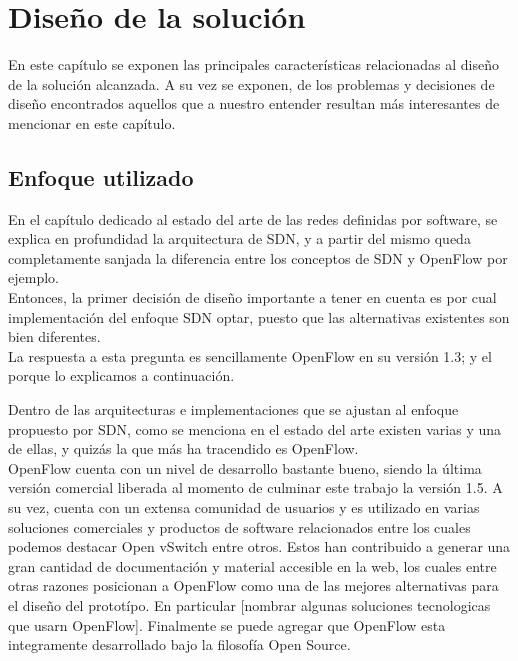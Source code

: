 \chapter{Dise\~no de la soluci\'on}

\ifpdf
    \graphicspath{{Chapter3/Figs/Raster/}{Chapter3/Figs/PDF/}{Chapter3/Figs/}}
\else
    \graphicspath{{Chapter3/Figs/Vector/}{Chapter3/Figs/}}
\fi

En este cap\'itulo se exponen las principales caracter\'isticas relacionadas al dise\~no de la soluci\'on alcanzada. A su vez se exponen, de los problemas y decisiones de dise\~no encontrados aquellos que a nuestro entender resultan m\'as interesantes de mencionar en este cap\'itulo. 
 
\section[Enfoque utilizado]{Enfoque utilizado}

En el cap\'itulo dedicado al estado del arte de las redes definidas por software, se explica en profundidad la arquitectura de SDN, y a partir del mismo queda completamente sanjada la diferencia entre los conceptos de SDN y OpenFlow por ejemplo.\\

Entonces, la primer decisi\'on de dise\~no importante a tener en cuenta es por cual implementaci\'on del enfoque SDN optar, puesto que las alternativas existentes son bien diferentes.\\
 
La respuesta a esta pregunta es sencillamente OpenFlow en su versi\'on 1.3; y el porque lo explicamos a continuaci\'on.

Dentro de las arquitecturas e implementaciones que se ajustan al enfoque propuesto por SDN, como se menciona en el estado del arte existen varias y una de ellas, y quiz\'as la que m\'as ha tracendido es OpenFlow.\\
OpenFlow cuenta con un nivel de desarrollo bastante bueno, siendo la \'ultima versi\'on comercial liberada al momento de culminar este trabajo la versi\'on 1.5.
A su vez, cuenta con un extensa comunidad de usuarios y es utilizado en varias soluciones comerciales y productos de software relacionados entre los cuales podemos destacar Open vSwitch entre otros. Estos han contribuido a generar una gran cantidad de documentaci\'on y material accesible en la web, los cuales entre otras razones posicionan a OpenFlow como una de las mejores alternativas para el dise\~no del protot\'ipo. En particular [nombrar algunas soluciones tecnologicas que usarn OpenFlow].
Finalmente se puede agregar que OpenFlow esta integramente desarrollado bajo la filosof\'ia Open Source.\\

